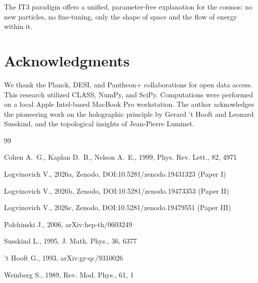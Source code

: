 \documentclass[12pt,a4paper]{article}
\begin{document}
The IT3 paradigm offers a unified, parameter-free explanation for the cosmos: no new particles, no fine-tuning, only the shape of space and the flow of energy within it.

\section*{Acknowledgments}

We thank the Planck, DESI, and Pantheon+ collaborations for open data access. This research utilized CLASS, NumPy, and SciPy. Computations were performed on a local Apple Intel-based MacBook Pro workstation. The author acknowledges the pioneering work on the holographic principle by Gerard 't Hooft and Leonard Susskind, and the topological insights of Jean-Pierre Luminet.

\begin{thebibliography}{99}

Cohen A.~G., Kaplan D.~B., Nelson A.~E., 1999, Phys. Rev. Lett., 82, 4971

Logvinovich V., 2026a, Zenodo, DOI:10.5281/zenodo.19431323 (Paper I)

Logvinovich V., 2026b, Zenodo, DOI:10.5281/zenodo.19473353 (Paper II)

Logvinovich V., 2026c, Zenodo, DOI:10.5281/zenodo.19479551 (Paper III)

Polchinski J., 2006, arXiv:hep-th/0603249

Susskind L., 1995, J. Math. Phys., 36, 6377

't Hooft G., 1993, arXiv:gr-qc/9310026

Weinberg S., 1989, Rev. Mod. Phys., 61, 1

\end{thebibliography}
\end{document}
